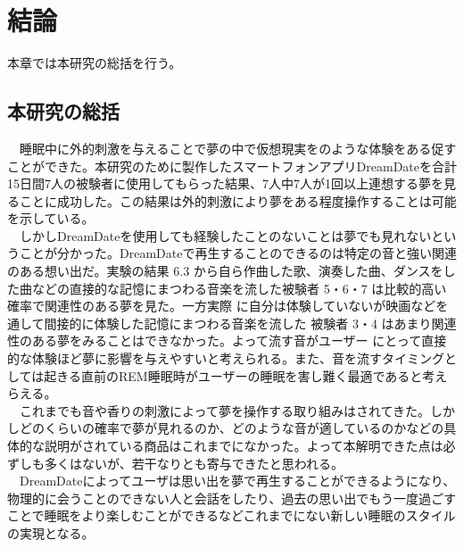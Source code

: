 \chapter{結論}
\label{chap:result}

本章では本研究の総括を行う。

\section{本研究の総括}
　睡眠中に外的刺激を与えることで夢の中で仮想現実をのような体験をある促すことができた。本研究のために製作したスマートフォンアプリDreamDateを合計15日間7人の被験者に使用してもらった結果、7人中7人が1回以上連想する夢を見ることに成功した。この結果は外的刺激により夢をある程度操作することは可能を示している。\\
　しかしDreamDateを使用しても経験したことのないことは夢でも見れないということが分かった。DreamDateで再生することのできるのは特定の音と強い関連のある想い出だ。実験の結果 6.3 から自ら作曲した歌、演奏した曲、ダンスをした曲などの直接的な記憶にまつわる音楽を流した被験者 5・6・7 は比較的高い確率で関連性のある夢を見た。一方実際 に自分は体験していないが映画などを通して間接的に体験した記憶にまつわる音楽を流した 被験者 3・4 はあまり関連性のある夢をみることはできなかった。よって流す音がユーザー にとって直接的な体験ほど夢に影響を与えやすいと考えられる。また、音を流すタイミングとしては起きる直前のREM睡眠時がユーザーの睡眠を害し難く最適であると考えらえる。\\
　これまでも音や香りの刺激によって夢を操作する取り組みはされてきた。しかしどのくらいの確率で夢が見れるのか、どのような音が適しているのかなどの具体的な説明がされている商品はこれまでになかった。よって本解明できた点は必ずしも多くはないが、若干なりとも寄与できたと思われる。\\
　DreamDateによってユーザは思い出を夢で再生することができるようになり、物理的に会うことのできない人と会話をしたり、過去の思い出でもう一度過ごすことで睡眠をより楽しむことができるなどこれまでにない新しい睡眠のスタイルの実現となる。

